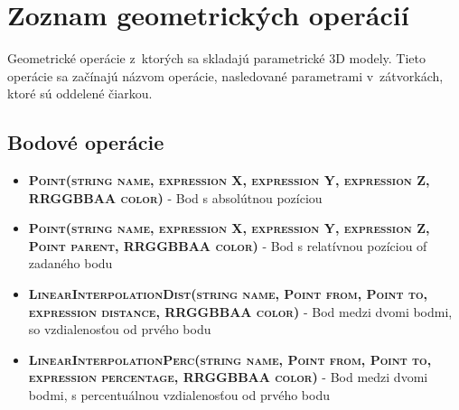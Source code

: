 

\chapter{Zoznam geometrických operácií}
\label{Priloha:zoznamGeometrickychOperacii}
Geometrické operácie z~ktorých sa skladajú parametrické 3D modely. Tieto operácie sa začínajú názvom operácie, nasledované parametrami v~zátvorkách, ktoré sú oddelené čiarkou.

\section*{Bodové operácie}
\begin{itemize}


\item \textsc{\textbf{Point(string name, expression X, expression Y, expression Z, RRGGBBAA color)}} - Bod s absolútnou pozíciou 
\item \textsc{\textbf{Point(string name, expression X, expression Y, expression Z, Point parent, RRGGBBAA color)}} - Bod s relatívnou pozíciou of zadaného bodu

\item \textsc{\textbf{LinearInterpolationDist(string name, Point from, Point to, expression distance, RRGGBBAA color)}} - Bod medzi dvomi bodmi, so vzdialenosťou od prvého bodu
		 
\item \textsc{\textbf{LinearInterpolationPerc(string name, Point from, Point to, expression percentage, RRGGBBAA color)}} - Bod medzi dvomi bodmi, s percentuálnou vzdialenosťou od prvého bodu


\end{itemize}
